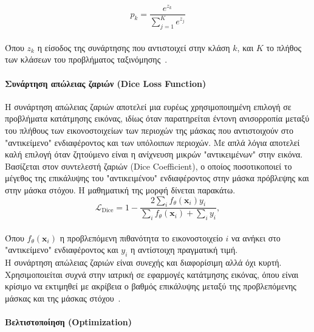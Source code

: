 \documentclass[12pt]{article}
\numberwithin{equation}{section}
\begin{document}
\begin{equation}
p_k = \frac{e^{z_k}}{\sum_{j=1}^{K} e^{z_j}}
\end{equation}\\

\noindent Όπου \(z_k\) η είσοδος της συνάρτησης που αντιστοιχεί στην κλάση \(k\), και \(K\) το πλήθος των κλάσεων του προβλήματος ταξινόμησης~\cite{hughes2024crossentropy}.\\


\paragraph{Συνάρτηση απώλειας ζαριών (Dice Loss Function)\\ [0.5 cm]}

Η συνάρτηση απώλειας ζαριών αποτελεί μια ευρέως χρησιμοποιημένη επιλογή σε προβλήματα κατάτμησης εικόνας, ιδίως όταν παρατηρείται έντονη ανισορροπία μεταξύ του πλήθους των εικονοστοιχείων των περιοχών της μάσκας που αντιστοιχούν στο "αντικείμενο" ενδιαφέροντος και των υπόλοιπων περιοχών. Με απλά λόγια αποτελεί καλή επιλογή όταν ζητούμενο είναι η ανίχνευση μικρών "αντικειμένων" στην εικόνα. Βασίζεται στον συντελεστή ζαριών (Dice Coefficient), ο οποίος ποσοτικοποιεί το μέγεθος της επικάλυψης του "αντικειμένου" ενδιαφέροντος στην μάσκα πρόβλεψης και στην μάσκα στόχου. Η μαθηματική της μορφή δίνεται παρακάτω.\\

\begin{equation}
\mathcal{L}_{\text{Dice}} = 1 - \frac{2 \sum_i f_\theta(\mathbf{x}_i) y_i}{\sum_i f_\theta(\mathbf{x}_i) + \sum_i y_i},
\end{equation}\\

\noindent Όπου \(f_\theta(\mathbf{x}_i)\) η προβλεπόμενη πιθανότητα το εικονοστοιχείο \(i\) να ανήκει στο "αντικείμενο" ενδιαφέροντος και \(y_i\) η αντίστοιχη πραγματική τιμή.\\

\noindent Η συνάρτηση απώλειας ζαριών είναι συνεχής και διαφορίσιμη αλλά όχι κυρτή. Χρησιμοποιείται συχνά στην ιατρική σε εφαρμογές κατάτμησης εικόνας, όπου είναι κρίσιμο να εκτιμηθεί με ακρίβεια ο βαθμός επικάλυψης μεταξύ της προβλεπόμενης μάσκας και της μάσκας στόχου~\cite{ciampiconi2024surveytaxonomylossfunctions}.\\

\paragraph{Βελτιστοποίηση (Optimization)\\ [0.5 cm]}
\end{document}
